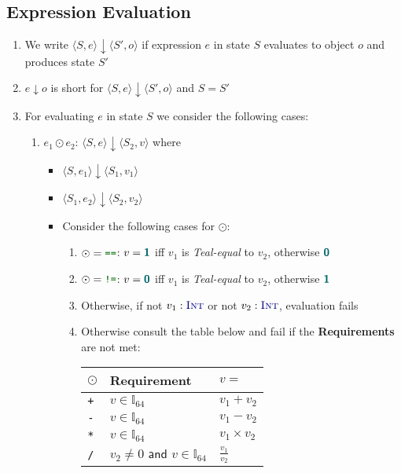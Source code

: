 \documentclass{article}
\newcommand{\tuple}[1]{\ensuremath{\langle #1 \rangle}}
\newcommand{\vterminal}[1]{\textsf{\textcolor{dgreen}{\texttt{#1}}}}
\newcommand{\Ty}[1]{\textcolor{dblue}{#1}}
\newcommand{\TInt}{\Ty{\textsc{Int}}}
\newcommand{\Vint}[1]{{\textsf{\textcolor{dcyan}{\textbf{#1}}}}}
\newcommand{\fail}{\textcolor{dred}{fail}}
\begin{document}
\subsection{Expression Evaluation}\label{sec:eeval}
\begin{enumerate}
\item We write $\tuple{S,e} \downarrow \tuple{S',o}$ if expression $e$ in state $S$ evaluates to object $o$ and produces state $S'$
\item $e \downarrow o$ is short for $\tuple{S,e} \downarrow \tuple{S',o}$ and $S = S'$
\item For evaluating $e$ in state $S$ we consider the following cases:
  \begin{enumerate}
  \item \vterminal{$e_1 \odot e_2$}: $\tuple{S, e} \downarrow \tuple{S_2, v}$ where
    \begin{itemize}
      \item $\tuple{S, e_1} \downarrow \tuple{S_1, v_1}$
      \item $\tuple{S_1, e_2} \downarrow \tuple{S_2, v_2}$
      \item Consider the following cases for $\odot$:
        \begin{enumerate}
          \item $\odot = \vterminal{==}$: $v = \Vint{1}$ iff $v_1$ is \emph{Teal-equal} to $v_2$, otherwise $\Vint{0}$
          \item $\odot = \vterminal{!=}$: $v = \Vint{0}$ iff $v_1$ is \emph{Teal-equal} to $v_2$, otherwise $\Vint{1}$
          \item Otherwise, if not $v_1 : \TInt$ or not $v_2 : \TInt$, evaluation \fail{}s
          \item Otherwise consult the table below and \fail{} if the \textbf{Requirements} are not met:\\
            \begin{tabular}{|l|l|l|}
              \hline
              $\odot$ & \textbf{Requirement} & $v = $\\
              \hline
              \hline
              \vterminal{+}	& $v \in \mathbb{I}_{64}$			& $v_1 + v_2$ \\
              \hline
              \vterminal{-}	& $v \in \mathbb{I}_{64}$			& $v_1 - v_2$ \\
              \hline
              \vterminal{*}	& $v \in \mathbb{I}_{64}$			& $v_1 \times v_2$ \\
              \hline
              \vterminal{/}	& $v_2 \ne 0 \textsf{ and }v \in \mathbb{I}_{64}$		& $\frac{v_1}{v_2}$ \\

\end{tabular}
\end{enumerate}
\end{itemize}
\end{enumerate}
\end{enumerate}
\end{document}

